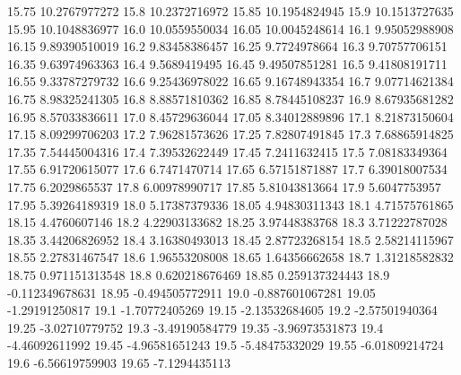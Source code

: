           15.75    10.2767977272
           15.8    10.2372716972
          15.85    10.1954824945
           15.9    10.1513727635
          15.95    10.1048836977
           16.0    10.0559550034
          16.05    10.0045248614
           16.1    9.95052988908
          16.15    9.89390510019
           16.2    9.83458386457
          16.25     9.7724978664
           16.3    9.70757706151
          16.35    9.63974963363
           16.4     9.5689419495
          16.45    9.49507851281
           16.5    9.41808191711
          16.55    9.33787279732
           16.6    9.25436978022
          16.65    9.16748943354
           16.7    9.07714621384
          16.75    8.98325241305
           16.8    8.88571810362
          16.85    8.78445108237
           16.9    8.67935681282
          16.95    8.57033836611
           17.0    8.45729636044
          17.05    8.34012889896
           17.1    8.21873150604
          17.15    8.09299706203
           17.2    7.96281573626
          17.25    7.82807491845
           17.3    7.68865914825
          17.35    7.54445004316
           17.4    7.39532622449
          17.45     7.2411632415
           17.5    7.08183349364
          17.55    6.91720615077
           17.6     6.7471470714
          17.65    6.57151871887
           17.7    6.39018007534
          17.75     6.2029865537
           17.8    6.00978990717
          17.85    5.81043813664
           17.9     5.6047753957
          17.95    5.39264189319
           18.0    5.17387379336
          18.05    4.94830311343
           18.1    4.71575761865
          18.15     4.4760607146
           18.2    4.22903133682
          18.25    3.97448383768
           18.3    3.71222787028
          18.35    3.44206826952
           18.4    3.16380493013
          18.45    2.87723268154
           18.5    2.58214115967
          18.55    2.27831467547
           18.6    1.96553208008
          18.65    1.64356662658
           18.7    1.31218582832
          18.75   0.971151313548
           18.8   0.620218676469
          18.85   0.259137324443
           18.9  -0.112349678631
          18.95  -0.494505772911
           19.0  -0.887601067281
          19.05   -1.29191250817
           19.1   -1.70772405269
          19.15   -2.13532684605
           19.2   -2.57501940364
          19.25   -3.02710779752
           19.3   -3.49190584779
          19.35   -3.96973531873
           19.4   -4.46092611992
          19.45   -4.96581651243
           19.5   -5.48475332029
          19.55   -6.01809214724
           19.6   -6.56619759903
          19.65    -7.1294435113
